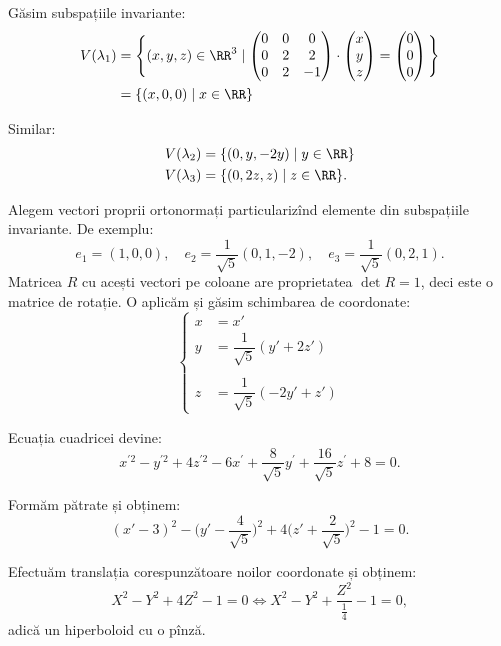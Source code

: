 Găsim subspațiile invariante:
\begin{align*}
  V(\lambda_1) &= \Bigg\{ (x, y, z) \in \RR^3 \mid %
                 \begin{pmatrix}
                   0 & 0 & 0 \\
                   0 & 2 & 2 \\
                   0 & 2 & -1
                 \end{pmatrix} \cdot
                           \begin{pmatrix}
                             x \\ y \\ z
                           \end{pmatrix}  =
  \begin{pmatrix}
    0 \\ 0 \\ 0
  \end{pmatrix} \Bigg\} \\
               &= \{ (x, 0, 0) \mid x \in \RR \}
\end{align*}

Similar:
\begin{align*}
  V(\lambda_2) &= \{ (0, y, -2y) \mid y \in \RR \} \\
  V(\lambda_3) &= \{ (0, 2z, z) \mid z \in \RR \}.
\end{align*}

Alegem vectori proprii ortonormați particularizînd elemente din
subspațiile invariante.
De exemplu:
\[
  e_1 = (1, 0, 0), \quad e_2 = \frac{1}{\sqrt{5}} (0, 1, -2), %
  \quad e_3 = \frac{1}{\sqrt{5}}(0, 2, 1).
\]
Matricea $R$ cu acești vectori pe coloane are proprietatea $\det R = 1$, deci
este o matrice de rotație. O aplicăm și găsim schimbarea de coordonate:
\[
  \begin{cases}
    x &= x' \\
    y &= \dfrac{1}{\sqrt{5}} (y' + 2z') \\
      & \\
    z &= \dfrac{1}{\sqrt{5}} (-2y' + z')
  \end{cases}
\]

Ecuația cuadricei devine:
\[
  x^{\prime 2} - y^{\prime 2} + 4 z^{\prime 2} - 6x^\prime + %
  \frac{8}{\sqrt{5}} y^\prime + \frac{16}{\sqrt{5}} z^\prime + 8 = 0.
\]

Formăm pătrate și obținem:
\[
  (x' - 3)^2 - \big( y' - \frac{4}{\sqrt{5}} \big)^2 + %
  4 \big(z' + \frac{2}{\sqrt{5}} \big)^2 - 1 = 0.
\]

Efectuăm translația corespunzătoare noilor coordonate și obținem:
\[
  X^2 - Y^2 + 4Z^2 - 1 = 0 \Leftrightarrow X^2 - Y^2 + \frac{Z^2}{\frac{1}{4}} - 1 = 0,
\]
adică un hiperboloid cu o pînză.

